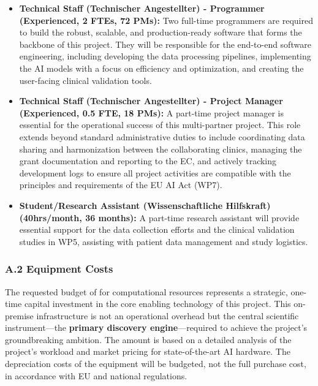 \documentclass[11pt, a4paper]{article}
\begin{document}
\begin{itemize}
    \item \textbf{Technical Staff (Technischer Angestellter) - Programmer (Experienced, 2 FTEs, 72 PMs):} Two full-time programmers are required to build the robust, scalable, and production-ready software that forms the backbone of this project. They will be responsible for the end-to-end software engineering, including developing the data processing pipelines, implementing the AI models with a focus on efficiency and optimization, and creating the user-facing clinical validation tools.
    \item \textbf{Technical Staff (Technischer Angestellter) - Project Manager (Experienced, 0.5 FTE, 18 PMs):} A part-time project manager is essential for the operational success of this multi-partner project. This role extends beyond standard administrative duties to include coordinating data sharing and harmonization between the collaborating clinics, managing the grant documentation and reporting to the EC, and actively tracking development logs to ensure all project activities are compatible with the principles and requirements of the EU AI Act (WP7).
    \item \textbf{Student/Research Assistant (Wissenschaftliche Hilfskraft) (40hrs/month, 36 months):} A part-time research assistant will provide essential support for the data collection efforts and the clinical validation studies in WP5, assisting with patient data management and study logistics.
\end{itemize}

\subsubsection*{A.2 Equipment Costs}
The requested budget of  for computational resources represents a strategic, one-time capital investment in the core enabling technology of this project. This on-premise infrastructure is not an operational overhead but the central scientific instrument—the \textbf{primary discovery engine}—required to achieve the project's groundbreaking ambition. The amount is based on a detailed analysis of the project's workload and market pricing for state-of-the-art AI hardware. The depreciation costs of the equipment will be budgeted, not the full purchase cost, in accordance with EU and national regulations.
\end{document}
